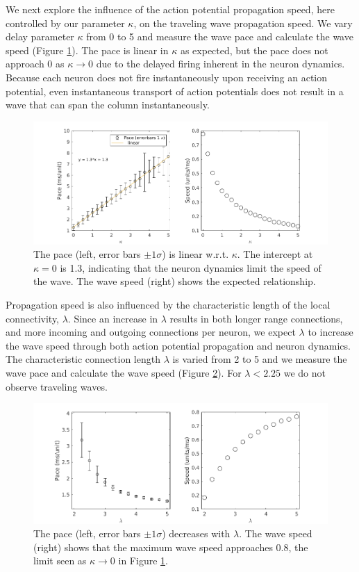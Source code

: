 \documentclass[12pt]{article}
\begin{document}
We next explore the influence of the action potential propagation speed, here controlled by our parameter $\kappa$, on the traveling wave propagation speed.
We vary delay parameter $\kappa$ from 0 to 5 and measure the wave pace and calculate the wave speed (Figure \ref{fig:delay_speed}).
The pace is linear in $\kappa$ as expected, but the pace does not approach $0$ as $\kappa \rightarrow 0$ due to the delayed firing inherent in the neuron dynamics.
Because each neuron does not fire instantaneously upon receiving an action potential, even instantaneous transport of action potentials does not result in a wave that can span the column instantaneously.
\begin{figure}[!htb]
 \caption{The pace (left, error bars $\pm 1 \sigma$) is linear w.r.t. $\kappa$. The intercept at $\kappa=0$ is 1.3, indicating that the neuron dynamics limit the speed of the wave. The wave speed (right) shows the expected relationship. }
 \label{fig:delay_speed}
 \centering
   \includegraphics[width=\textwidth]{fig/WaveSpeed_Delay}
\end{figure}

\FloatBarrier

Propagation speed is also influenced by the characteristic length of the local connectivity, $\lambda$.
Since an increase in $\lambda$ results in both longer range connections, and more incoming and outgoing connections per neuron, we expect $\lambda$ to increase the wave speed through both action potential propagation and neuron dynamics.
The characteristic connection length $\lambda$ is varied from 2 to 5 and we measure the wave pace and calculate the wave speed (Figure \ref{fig:delay_lambda}).
For $\lambda<2.25$ we do not observe traveling waves.
\begin{figure}[!htb]
 \caption{ The pace (left, error bars $\pm 1 \sigma$) decreases with $\lambda$. The wave speed (right) shows that the maximum wave speed approaches $0.8$, the limit seen as $\kappa \rightarrow 0$ in Figure \ref{fig:delay_speed}. }
 \label{fig:delay_lambda}
 \centering
   \includegraphics[width=\textwidth]{fig/WaveSpeed_Lambda}
\end{figure}
\end{document}

